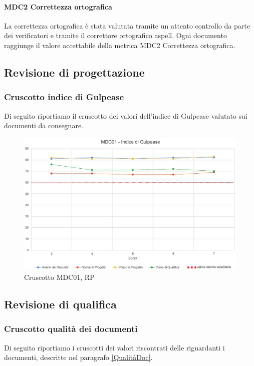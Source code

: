 \paragraph{MDC2 Correttezza ortografica}

La correttezza ortografica è stata valutata tramite un attento controllo da parte dei verificatori e tramite il correttore ortografico aspell.  Ogni documento raggiunge il valore accettabile della metrica MDC2 Correttezza ortografica. 
\newpage{}
\subsection{Revisione di progettazione}
\subsubsection{Cruscotto indice di Gulpease}

Di seguito riportiamo il cruscotto dei valori dell'indice di Gulpease valutato sui documenti da consegnare.

\begin{figure}[H]
    \centering
    \includegraphics[scale = 0.55]{immagini/GulpeaseRP.png}
    \caption{Cruscotto MDC01, RP}
\end{figure}

\newpage

\subsection{Revisione di qualifica}
\subsubsection{Cruscotto qualità dei documenti}
Di seguito riportiamo i cruscotti dei valori riscontrati delle  riguardanti i documenti, descritte nel paragrafo \ref{QualitàDoc}.

